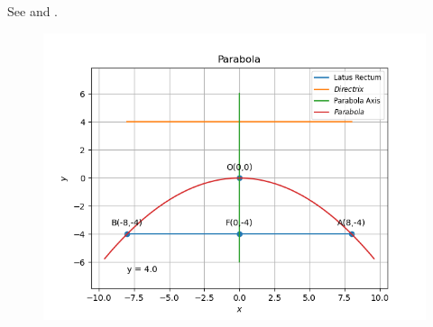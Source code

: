 See 
and 
.
\begin{figure}[!h]
	\begin{center} 
	    \includegraphics[width=\columnwidth]{chapters/11/11/2/4/figs/parabola}
	\end{center}
\caption{}
\label{fig:chapters/11/11/2/4/Fig1}
\end{figure}
